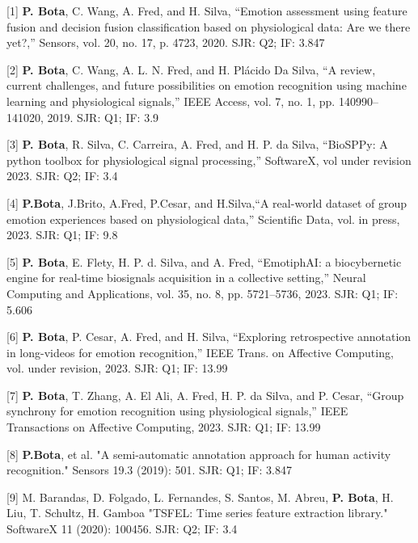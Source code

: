 


\cventry
{} %
{} %
{} %
{} %
{
  \begin{cvitems} %
    \item {[1] \textbf{P. Bota}, C. Wang, A. Fred, and H. Silva, “Emotion assessment using feature fusion and decision fusion classification based on physiological data: Are we there yet?,” Sensors, vol. 20, no. 17, p. 4723, 2020. SJR: Q2; IF: 3.847} 
    \item {[2] \textbf{P. Bota}, C. Wang, A. L. N. Fred, and H. Plácido Da Silva, “A review, current challenges, and future possibilities on emotion recognition using machine learning and physiological signals,” IEEE Access, vol. 7, no. 1, pp. 140990–141020, 2019. SJR: Q1; IF: 3.9}
    \item {[3] \textbf{P. Bota}, R. Silva, C. Carreira, A. Fred, and H. P. da Silva, “BioSPPy: A python toolbox for physiological signal processing,” SoftwareX, vol under revision 2023. SJR: Q2; IF: 3.4}
    \item {[4] \textbf{P.Bota}, J.Brito, A.Fred, P.Cesar, and H.Silva,“A real-world dataset of group emotion experiences based on physiological data,” Scientific Data, vol. in press, 2023. SJR: Q1; IF: 9.8}
    \item {[5] \textbf{P. Bota}, E. Flety, H. P. d. Silva, and A. Fred, “EmotiphAI: a biocybernetic engine for real-time biosignals acquisition in a collective setting,” Neural Computing and Applications, vol. 35, no. 8, pp. 5721–5736, 2023. SJR: Q1; IF: 5.606}
    \item {[6] \textbf{P. Bota}, P. Cesar, A. Fred, and H. Silva, “Exploring retrospective annotation in long-videos for emotion recognition,” IEEE Trans. on Affective Computing, vol. under revision, 2023. SJR: Q1; IF: 13.99}
    \item {[7] \textbf{P. Bota}, T. Zhang, A. El Ali, A. Fred, H. P. da Silva, and P. Cesar, “Group synchrony for emotion recognition using physiological signals,” IEEE Transactions on Affective Computing, 2023. SJR: Q1; IF: 13.99}
    \item {[8] \textbf{P.Bota}, et al. "A semi-automatic annotation approach for human activity recognition." Sensors 19.3 (2019): 501. SJR: Q1; IF: 3.847}
    \item {[9] M. Barandas, D. Folgado, L. Fernandes, S. Santos, M. Abreu, \textbf{P. Bota}, H. Liu, T. Schultz, H. Gamboa "TSFEL: Time series feature extraction library." SoftwareX 11 (2020): 100456. SJR: Q2; IF: 3.4}
  \end{cvitems}
}

